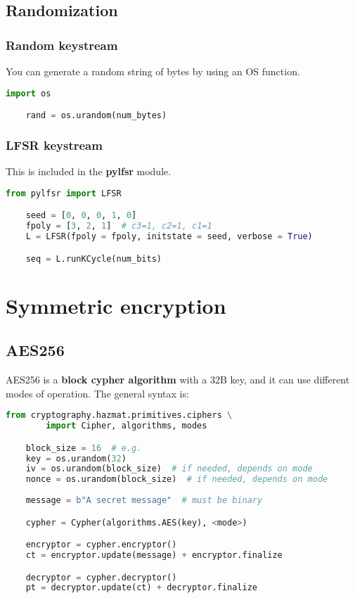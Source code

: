 \documentclass[a4paper, 12 pt]{memoir}
\begin{document}
\section{Randomization}
\subsection{Random keystream}
You can generate a random string of bytes by using an OS function.

\begin{lstlisting}[language=Python]
    import os

    rand = os.urandom(num_bytes)
\end{lstlisting}

\subsection{LFSR keystream}
This is included in the \textbf{pylfsr} module.
\begin{lstlisting}[language=Python]
    from pylfsr import LFSR

    seed = [0, 0, 0, 1, 0]
    fpoly = [3, 2, 1]  # c3=1, c2=1, c1=1
    L = LFSR(fpoly = fpoly, initstate = seed, verbose = True)

    seq = L.runKCycle(num_bits)
\end{lstlisting}


\chapter{Symmetric encryption}

\section{AES256}
AES256 is a \textbf{block cypher algorithm} with a 32B key, and it can use different modes of operation. The general syntax is:

\begin{lstlisting}[language=Python]
    from cryptography.hazmat.primitives.ciphers \
        import Cipher, algorithms, modes

    block_size = 16  # e.g.
    key = os.urandom(32)
    iv = os.urandom(block_size)  # if needed, depends on mode
    nonce = os.urandom(block_size)  # if needed, depends on mode
    
    message = b"A secret message"  # must be binary

    cypher = Cypher(algorithms.AES(key), <mode>)

    encryptor = cypher.encryptor()
    ct = encryptor.update(message) + encryptor.finalize

    decryptor = cypher.decryptor()
    pt = decryptor.update(ct) + decryptor.finalize
\end{lstlisting}
\end{document}

